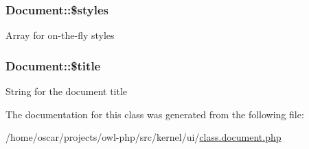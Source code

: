 \subsubsection[{\$styles}]{\setlength{\rightskip}{0pt plus 5cm}Document::\$styles}\label{classDocument_a5ef42574b069d405190dea3a7d977cb2}
Array for on-\/the-\/fly styles 
\subsubsection[{\$title}]{\setlength{\rightskip}{0pt plus 5cm}Document::\$title}\label{classDocument_a7cd6b0f7a5c8926d8b89e23bee51e7f5}
String for the document title 

The documentation for this class was generated from the following file:\begin{DoxyCompactItemize}
\item 
/home/oscar/projects/owl-\/php/src/kernel/ui/\hyperlink{class_8document_8php}{class.document.php}\end{DoxyCompactItemize}
